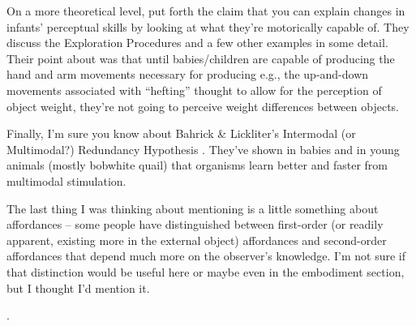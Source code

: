 On a more theoretical level, \cite{bushnell93motor} put forth the
claim that you can explain changes in infants' perceptual skills by
looking at what they're motorically capable of.  They discuss the
\cite{lederman87hand} Exploration Procedures and a few other examples in
some detail.  Their point about  was that until
babies/children are capable of producing the hand and arm movements
necessary for producing e.g., the up-and-down movements associated
with ``hefting'' thought to allow for the perception of object weight,
they're not going to perceive weight differences between objects.

Finally, I'm sure you know about Bahrick \& Lickliter's Intermodal (or
Multimodal?) Redundancy Hypothesis \cite{bahrick00intersensory}.  
They've shown in babies and in
young animals (mostly bobwhite quail) that organisms learn better and
faster from multimodal stimulation.



The last thing I was thinking about mentioning is a little something
about affordances -- some people have distinguished between
first-order (or readily apparent, existing more in the external
object) affordances and second-order affordances that depend much more
on the observer's knowledge.  I'm not sure if that distinction would
be useful here or maybe even in the embodiment section, but I thought
I'd mention it.


\nocite{lewkowicz00development}
\nocite{lewkowicz80crossmodal}
\nocite{lewkowicz04learning}
\nocite{bahrick04development}
\nocite{hernandez01development}
\nocite{bahrick03development}
\nocite{bahrick00intersensory}
\nocite{gibson86ecological}
\nocite{prince05synching}
\nocite{bushnell85recognition}.

